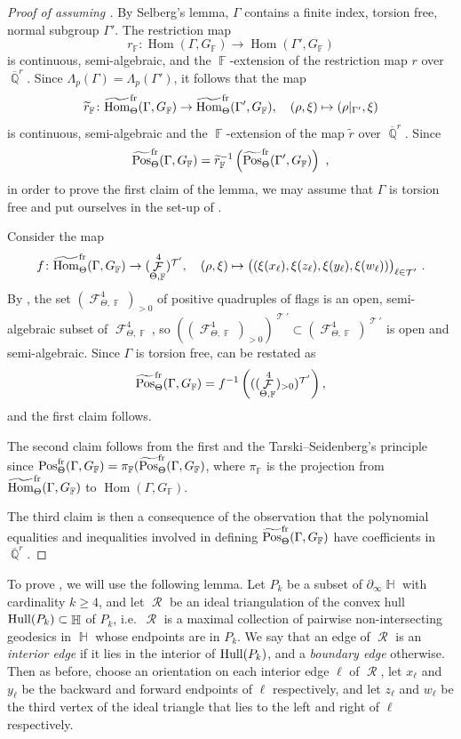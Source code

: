 \documentclass{amsart}
\theoremstyle{plain}
\theoremstyle{definition}
\DeclareMathOperator{\Hom}{Hom}
\DeclareMathOperator{\Pos}{Pos}
\DeclareMathOperator{\Fc}{\mathcal{F}}
\DeclareMathOperator{\Rc}{\mathcal{R}}
\DeclareMathOperator{\Tc}{\mathcal{T}}
\DeclareMathOperator{\Fb}{{\mathbb{F}}}
\DeclareMathOperator{\Hb}{\mathbb{H}}
\DeclareMathOperator{\Qb}{\mathbb{Q}}
\newcommand{\fr}{\textnormal{fr}}
\newcommand{\Qbar}{\overline{\Qb}^r}
\newcommand{\1}{\mathbf{1}}
\begin{document}
\begin{proof}[Proof of  assuming ]
By Selberg's lemma, $\Gamma$ contains a finite index, torsion free, normal subgroup $\Gamma'$. The restriction map
\[r_{\Fb}\colon\Hom(\Gamma,G_{\Fb})\to\Hom(\Gamma',G_{\Fb})\]
is continuous, semi-algebraic, and the $\Fb$-extension of the restriction map $r$ over $\Qbar$.
Since $\Lambda_p(\Gamma)=\Lambda_p(\Gamma')$, it follows that the map
\[\widetilde{r}_{\Fb}\colon \widetilde{\Hom}_\Theta^{\fr}(\Gamma,G_{\Fb})\to\widetilde{\Hom}_\Theta^{\fr}(\Gamma',G_{\Fb}), \quad (\rho,\xi)\mapsto(\rho|_{\Gamma'},\xi)\]
is continuous, semi-algebraic and the $\Fb$-extension of the map $\widetilde{r}$ over $\Qbar$.
Since
\[\widetilde{\Pos}_\Theta^{\fr}(\Gamma,G_{\Fb})=\widetilde{r}_{\Fb}^{-1}\left(\widetilde{\Pos}_\Theta^{\fr}(\Gamma',G_{\Fb})\right)~,\]
in order to prove the first claim of the lemma, we may assume that $\Gamma$ is torsion free and put ourselves in the set-up of .

Consider the map
\[f\colon\widetilde{\Hom}_\Theta^{\fr}(\Gamma,G_{\Fb})\to(\Fc_{\Theta,\Fb}^4)^{\Tc'}, \quad (\rho,\xi)\mapsto \big((\xi(x_\ell),\xi(z_\ell),\xi(y_\ell),\xi(w_\ell))\big)_{\ell\in\Tc'}~.\]
By , the set $(\Fc_{\Theta,\Fb}^4)_{>0}$ of positive quadruples of flags is an open, semi-algebraic subset of $\Fc_{\Theta,\Fb}^4$, so $((\Fc_{\Theta,\Fb}^4)_{>0})^{\Tc'}\subset(\Fc_{\Theta,\Fb}^4)^{\Tc'}$ is open and semi-algebraic. Since $\Gamma$ is torsion free,  can be restated as
\[\widetilde{\Pos}_\Theta^{\fr}(\Gamma,G_{\Fb})=f^{-1}\left(((\Fc_{\Theta,\Fb}^4)_{>0})^{\Tc'}\right),\]
and the first claim follows.

The second claim follows from the first and the Tarski--Seidenberg's principle since $\Pos_\Theta^{\fr}(\Gamma,G_{\Fb}) = \pi_{\Fb}(\widetilde{\Pos}_\Theta^{\fr}(\Gamma,G_{\Fb})$, where $\pi_{\Fb}$ is the projection from $\widetilde{\Hom}_\Theta^{\fr}(\Gamma,G_{\Fb})$ to $\Hom(\Gamma,G_{\Fb})$.

The third claim is then a consequence of the observation that the polynomial equalities and inequalities involved in defining $\widetilde{\Pos}_\Theta^{\fr}(\Gamma,G_{\Fb})$ have coefficients in $\overline{\Qb}^r$.
\end{proof}



To prove , we will use the following lemma.
Let $P_k$ be a subset of $\partial_\infty\Hb$ with cardinality $k\ge 4$, and let $\Rc$ be an ideal triangulation of the convex hull ${\rm Hull}(P_k)\subset\Hb$ of $P_k$, i.e.\ $\Rc$ is a maximal collection of pairwise non-intersecting geodesics in $\Hb$ whose endpoints are in $P_k$.
We say that an edge of $\Rc$ is an \emph{interior edge} if it lies in the interior of ${\rm Hull}(P_k)$, and a \emph{boundary edge} otherwise.
Then as before, choose an orientation on each interior edge $\ell$ of $\Rc$, let $x_\ell$ and $y_\ell$ be the backward and forward endpoints of $\ell$ respectively, and let $z_\ell$ and $w_\ell$ be the third vertex of the ideal triangle that lies to the left and right of $\ell$ respectively.
\end{document}
